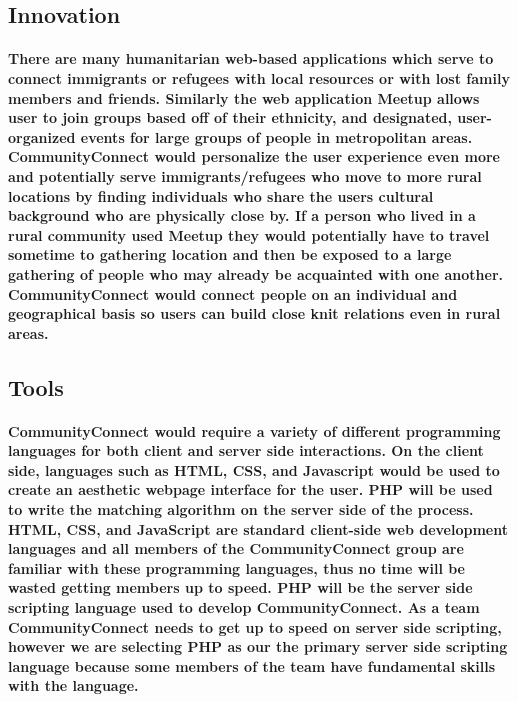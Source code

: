 \documentclass[12pt]{article}
\begin{document}
	\subsection{\bf Innovation}
                \paragraph{\normalfont \indent There are many humanitarian web-based applications which serve to connect immigrants or refugees with local resources or with lost family members and friends. Similarly the web application Meetup allows user to join groups based off of their ethnicity, and designated, user-organized events for large groups of people in metropolitan areas. CommunityConnect would personalize the user experience even more and potentially serve immigrants/refugees who move to more rural locations by finding individuals who share the users cultural background who are physically close by. If a person who lived in a rural community used Meetup they would potentially have to travel sometime to gathering location and then be exposed to a large gathering of people who may already be acquainted with one another. CommunityConnect would connect people on an individual and geographical basis so users can build close knit relations even in rural areas.
                }
	\subsection{\bf Tools}
		\paragraph{\normalfont \indent CommunityConnect would require a variety of different programming languages for both client and server side interactions. On the client side, languages such as HTML, CSS, and Javascript would be used to create an aesthetic webpage interface for the user. PHP will be used to write the matching algorithm on the server side of the process. HTML, CSS, and JavaScript are standard client-side web development languages and all members of the CommunityConnect group are familiar with these programming languages, thus no time will be wasted getting members up to speed. PHP will be the server side scripting language used to develop CommunityConnect. As a team CommunityConnect needs to get up to speed on server side scripting, however we are selecting PHP as our the primary server side scripting language because some members of the team have fundamental skills with the language.
		}
\end{document}
